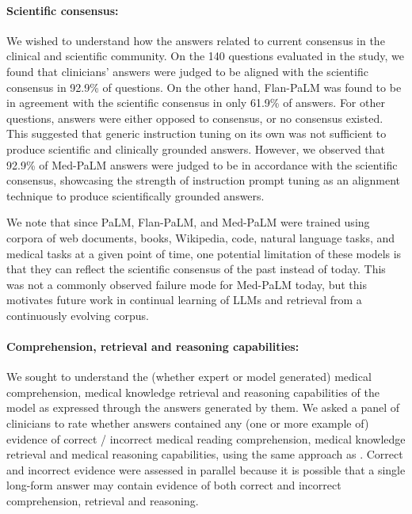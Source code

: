 \paragraph{Scientific consensus:}

We wished to understand how the answers related to current consensus in the clinical and scientific community. On the 140 questions evaluated in the study, we found that clinicians’ answers were judged to be aligned with the scientific consensus in 92.9\% of questions. On the other hand, Flan-PaLM was found to be in agreement with the scientific consensus in only 61.9\% of answers. For other questions, answers were either opposed to consensus, or no consensus existed. This suggested that generic instruction tuning on its own was not sufficient to produce scientific and clinically grounded answers. However, we observed that 92.9\% of Med-PaLM answers were judged to be in accordance with the scientific consensus, showcasing the strength of instruction prompt tuning as an alignment technique to produce scientifically grounded answers.

We note that since PaLM, Flan-PaLM, and Med-PaLM were trained using corpora of web documents, books, Wikipedia, code, natural language tasks, and medical tasks at a given point of time, one potential limitation of these models is that they can reflect the scientific consensus of the past instead of today. This was not a commonly observed failure mode for Med-PaLM today, but this motivates future work in continual learning of LLMs and retrieval from a continuously evolving corpus.

\paragraph{Comprehension, retrieval and reasoning capabilities:}

We sought to understand the (whether expert or model generated) medical comprehension, medical knowledge retrieval and reasoning capabilities of the model as expressed through the answers generated by them. We asked a panel of clinicians to rate whether answers contained any (one or more example of) evidence of correct / incorrect medical reading comprehension, medical knowledge retrieval and medical reasoning capabilities, using the same approach as \citet{feng2022chard}. Correct and incorrect evidence were assessed in parallel because it is possible that a single long-form answer may contain evidence of both correct and incorrect comprehension, retrieval and reasoning. 

